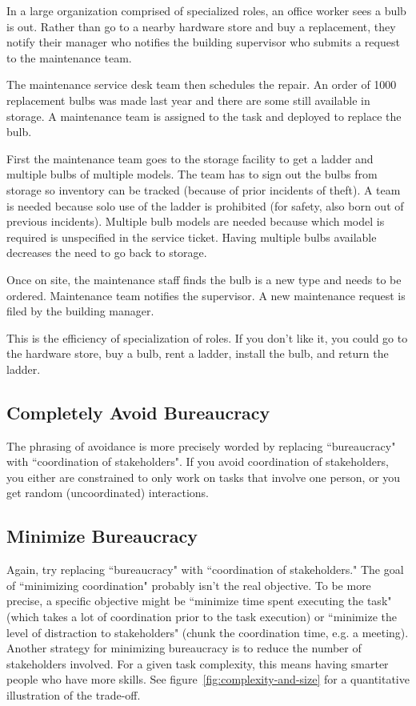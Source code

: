 \begin{mdframed}
In a large organization comprised of specialized roles, an office worker sees a bulb is out. Rather than go to a nearby hardware store and buy a replacement, they notify their manager who notifies the building supervisor who submits a request to the maintenance team. 

The maintenance service desk team then schedules the repair. An order of 1000 replacement bulbs was made last year and there are some still available in storage. A maintenance team is assigned to the task and deployed to replace the bulb. 

First the maintenance team goes to the storage facility to get a ladder and multiple bulbs of multiple models. The team has to sign out the bulbs from storage so inventory can be tracked (because of prior incidents of theft). A team is needed because solo use of the ladder is prohibited (for safety, also born out of previous incidents). Multiple bulb models are needed because which model is required is unspecified in the service ticket. Having multiple bulbs available decreases the need to go back to storage. 

Once on site, the maintenance staff finds the bulb is a new type and needs to be ordered. Maintenance team notifies the supervisor. A new maintenance request is filed by the building manager.
\end{mdframed}

This is the efficiency of specialization of roles. If you don't like it, you could go to the hardware store, buy a bulb, rent a ladder, install the bulb, and return the ladder.


\subsection*{Completely Avoid Bureaucracy}
The phrasing of avoidance is more precisely worded by replacing ``bureaucracy" with ``coordination of stakeholders". If you avoid coordination of stakeholders, you either are constrained to only work on tasks that involve one person, or you get random (uncoordinated) interactions. 

\subsection*{Minimize Bureaucracy}
Again, try replacing ``bureaucracy" with ``coordination of stakeholders." The goal of ``minimizing coordination" probably isn't the real objective. To be more precise, a specific objective might be ``minimize time spent executing the task" (which takes a lot of coordination prior to the task execution) or ``minimize the level of distraction to stakeholders" (chunk the coordination time, e.g. a meeting). Another strategy for minimizing bureaucracy is to reduce the number of stakeholders involved. For a given task complexity, this means having smarter people who have more skills. See figure~\ref{fig:complexity-and-size} for a quantitative illustration of the trade-off. 



